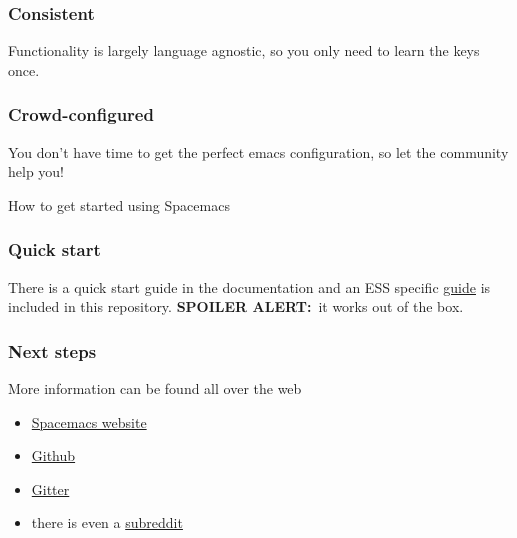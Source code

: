 \documentclass[presentation]{beamer}
\begin{document}
  \begin{frame}
    \frametitle{Consistent}
    Functionality is largely language agnostic, so you only need to learn the
    keys once.
  \end{frame}


  \begin{frame}
    \frametitle{Crowd-configured}
    You don't have time to get the perfect emacs configuration, so let the
    community help you!
  \end{frame}


  
  \begin{frame}
    How to get started using Spacemacs
  \end{frame}
  
  \begin{frame}
    \frametitle{Quick start}
    There is a quick start guide in the documentation and an ESS specific
    \href{https://github.com/ess-intro/presentation-ess-from-spacemacs/tree/main/presentation}{guide}
    is included in this repository.
    \newline
    \newline
    \textbf{SPOILER ALERT:}~it works out of the box.
  \end{frame}

  \begin{frame}
    \frametitle{Next steps}
    More information can be found all over the web
    \begin{itemize}
    \item \href{https://www.spacemacs.org/}{Spacemacs website}
    \item \href{https://github.com/syl20bnr/spacemacs}{Github}
    \item \href{https://gitter.im/syl20bnr/spacemacs}{Gitter}
    \item there is even a \href{https://www.reddit.com/r/spacemacs/}{subreddit}
    \end{itemize}
  \end{frame}
  
\end{document}
